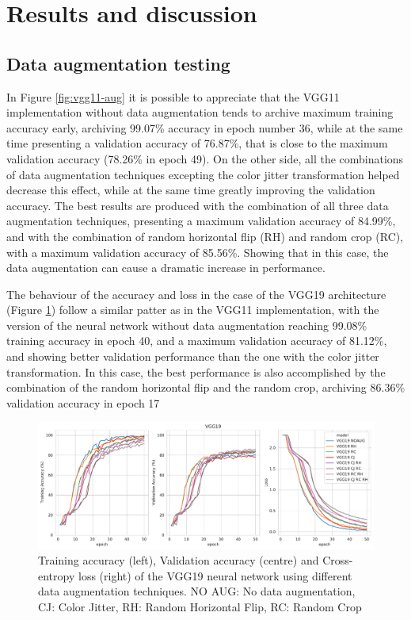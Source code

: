 \documentclass[10pt,twocolumn,letterpaper]{article}
\begin{document}
\section{Results and discussion}

\subsection{Data augmentation testing}

In Figure \ref{fig:vgg11-aug} it is possible to appreciate that the VGG11 implementation without data augmentation tends to archive maximum training accuracy early, archiving 99.07\% accuracy in epoch number 36, while at the same time presenting a validation accuracy of 76.87\%, that is close to the maximum validation accuracy (78.26\% in epoch 49). On the other side, all the combinations of data augmentation techniques excepting the color jitter transformation helped decrease this effect, while at the same time greatly improving the validation accuracy. The best results are produced with the combination of all three data augmentation techniques, presenting a maximum validation accuracy of 84.99\%, and with the combination of random horizontal flip (RH) and random crop (RC), with a maximum validation accuracy of 85.56\%. Showing that in this case, the data augmentation can cause a dramatic increase in performance.

The behaviour of the accuracy and loss in the case of the VGG19 architecture (Figure \ref{fig:vgg19-aug}) follow a similar patter as in the VGG11 implementation, with the version of the neural network without data augmentation reaching 99.08\% training accuracy in epoch 40, and a maximum validation accuracy of 81.12\%, and showing better validation performance than the one with the color jitter transformation. In this case, the best performance is also accomplished by the combination of the random horizontal flip and the random crop, archiving 86.36\% validation accuracy in epoch 17


\begin{figure}[h]
	\begin{center}
		\includegraphics[width=1.0\linewidth]{vgg19_aug.pdf}
		\caption{Training accuracy (left), Validation accuracy (centre) and Cross-entropy loss (right) of the VGG19 neural network using different data augmentation techniques. NO AUG: No data augmentation, CJ: Color Jitter, RH: Random Horizontal Flip, RC: Random Crop}
		\label{fig:vgg19-aug}
	\end{center}
\end{figure}
\end{document}
